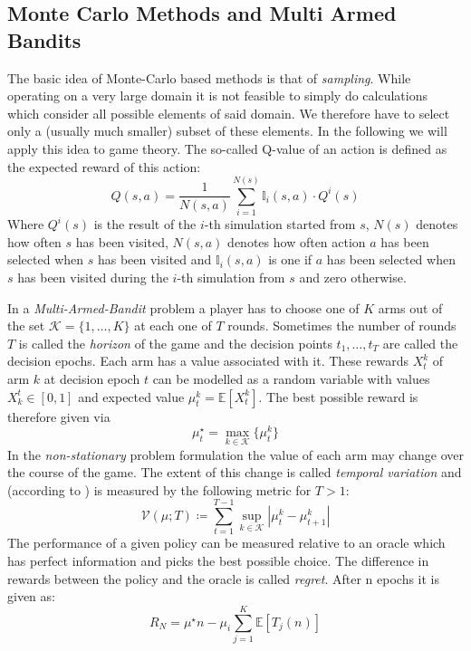 \subsection{Monte Carlo Methods and Multi Armed Bandits}
The basic idea of Monte-Carlo based methods is that of \textit{sampling}. While operating on a very large domain it is not feasible to simply do calculations which consider all possible elements of said domain. We therefore have to select only a (usually much smaller) subset of these elements. In the following we will apply this idea to game theory. The so-called Q-value of an action is defined as the expected reward of this action:
\begin{equation}
    Q(s,a)= \frac{1}{N(s,a)} \sum_{i=1}^{N(s)} \mathbb{I}_i(s,a) \cdot Q^i(s)
\end{equation}
Where $Q^i(s)$ is the result of the $i$-th simulation started from $s$, $N(s)$ denotes how often $s$ has been visited, $N(s,a)$ denotes how often action $a$ has been selected when $s$ has been visited and $\mathbb{I}_i(s,a)$ is one if $a$ has been selected when $s$ has been visited during the $i$-th simulation from $s$ and zero otherwise.


In a \textit{Multi-Armed-Bandit} problem a player has to choose one of $K$ arms out of the set $\mathcal{K} = \{1,\ldots,K \}$ at each one of $T$ rounds. Sometimes the number of rounds $T$ is called the \textit{horizon} of the game and the decision points $t_1,\ldots,t_T$ are called the decision epochs. Each arm has a value associated with it. These rewards $X^k_t$ of arm $k$ at decision epoch $t$ can be modelled as a random variable with values $X_k^t \in [0,1]$ and expected value $\mu_t^k = \mathbb{E}[X^k_t]$. The best possible reward is therefore given via 
\begin{equation*}
\mu^\star_t = \max_{k \in \mathcal{K}} \{ \mu^k_t\}    
\end{equation*}
In the \textit{non-stationary} problem formulation the value of each arm may change over the course of the game. The extent of this change is called \textit{temporal variation} and (according to \cite{besbes2019optimal}) is measured by the following metric for $T > 1$:
\begin{equation}
    \mathcal{V}(\mu;T) \coloneqq \sum_{t=1}^{T-1} \sup_{k \in \mathcal{K}} \left| \mu_t^k - \mu_{t+1}^k \right|
\end{equation}
The performance of a given policy can be measured relative to an oracle which has perfect information and picks the best possible choice. The difference in rewards between the policy and the oracle is called \textit{regret}. After n epochs it is given as:
\begin{equation}
    R_N = \mu^\star n - \mu_i \sum_{j=1}^K \mathbb{E}[T_j(n)]
\end{equation}

